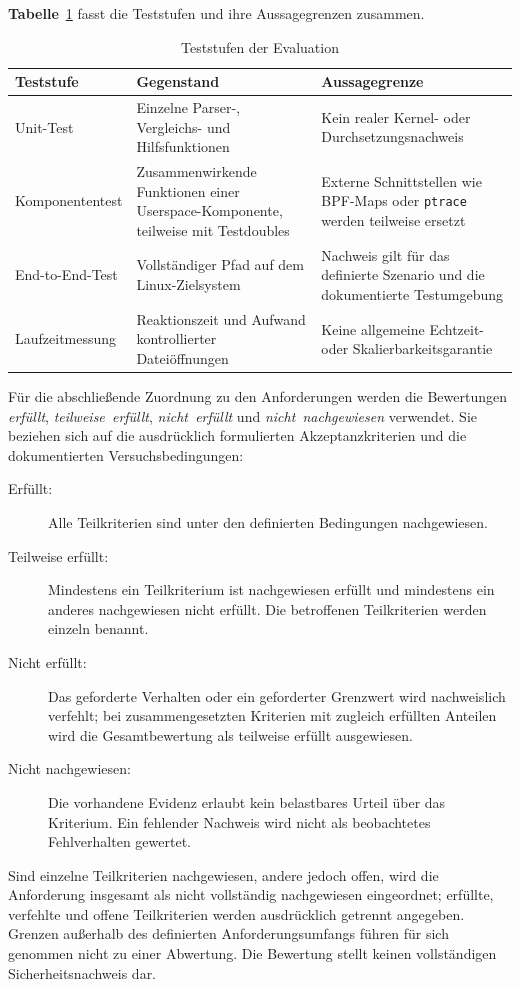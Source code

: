 \textbf{Tabelle}~\ref{tab:teststufen} fasst die Teststufen und ihre Aussagegrenzen zusammen.

\begin{table}[htbp]
    \centering
    \begin{tabular}{p{}p{}p{}}
        \hline
        \textbf{Teststufe} & \textbf{Gegenstand} & \textbf{Aussagegrenze} \\
        \hline
        Unit-Test & Einzelne Parser-, Vergleichs- und Hilfsfunktionen & Kein realer Kernel- oder
        Durchsetzungsnachweis \\
        Komponententest & Zusammenwirkende Funktionen einer Userspace-Komponente, teilweise mit
        Testdoubles & Externe Schnittstellen wie BPF-Maps oder \texttt{ptrace} werden teilweise
        ersetzt \\
        End-to-End-Test & Vollständiger Pfad auf dem Linux-Zielsystem & Nachweis gilt für das
        definierte Szenario und die dokumentierte Testumgebung \\
        Laufzeitmessung & Reaktionszeit und Aufwand kontrollierter Dateiöffnungen & Keine
        allgemeine Echtzeit- oder Skalierbarkeitsgarantie \\
        \hline
    \end{tabular}
    \caption{Teststufen der Evaluation}
    \label{tab:teststufen}
\end{table}

Für die abschließende Zuordnung zu den Anforderungen werden die Bewertungen
\emph{erfüllt}, \emph{teilweise~erfüllt}, \emph{nicht~erfüllt} und
\emph{nicht~nachgewiesen} verwendet. Sie beziehen sich auf die ausdrücklich formulierten
Akzeptanzkriterien und die dokumentierten Versuchsbedingungen:
\begin{description}
    \item[Erfüllt:] Alle Teilkriterien sind unter den definierten Bedingungen nachgewiesen.
    \item[Teilweise erfüllt:] Mindestens ein Teilkriterium ist nachgewiesen erfüllt und
    mindestens ein anderes nachgewiesen nicht erfüllt. Die betroffenen Teilkriterien werden
    einzeln benannt.
    \item[Nicht erfüllt:] Das geforderte Verhalten oder ein geforderter Grenzwert wird
    nachweislich verfehlt; bei zusammengesetzten Kriterien mit zugleich erfüllten Anteilen
    wird die Gesamtbewertung als teilweise erfüllt ausgewiesen.
    \item[Nicht nachgewiesen:] Die vorhandene Evidenz erlaubt kein belastbares Urteil über
    das Kriterium. Ein fehlender Nachweis wird nicht als beobachtetes Fehlverhalten gewertet.
\end{description}
Sind einzelne Teilkriterien nachgewiesen, andere jedoch offen, wird die Anforderung insgesamt
als nicht vollständig nachgewiesen eingeordnet; erfüllte, verfehlte und offene Teilkriterien
werden ausdrücklich getrennt angegeben. Grenzen außerhalb des definierten Anforderungsumfangs
führen für sich genommen nicht zu einer Abwertung. Die Bewertung stellt keinen vollständigen
Sicherheitsnachweis dar.

